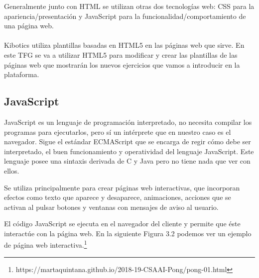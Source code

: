 Generalmente junto con HTML se utilizan otras dos tecnologías web: CSS para la apariencia/presentación y JavaScript para la funcionalidad/comportamiento de una página web.
\\
\\
Kibotics utiliza plantillas basadas en HTML5 en las páginas web que sirve. En este TFG se va a utilizar HTML5 para modificar y crear las plantillas de las páginas web que mostrarán los nuevos ejercicios que vamos a introducir en la plataforma.

\subsection{JavaScript}
JavaScript es un lenguaje de programación interpretado, no necesita compilar los programas para ejecutarlos, pero sí un intérprete que en nuestro caso es el navegador. Sigue el estándar ECMAScript que se encarga de regir cómo debe ser interpretado, el buen funcionamiento y operatividad del lenguaje JavaScript. Este lenguaje posee una sintaxis derivada de C y Java pero no tiene nada que ver con ellos.

Se utiliza principalmente para crear páginas web interactivas, que incorporan efectos como texto que aparece y
desaparece, animaciones, acciones que se activan al pulsar botones y ventanas con
mensajes de aviso al usuario\cite{javascript}.

El código JavaScript se ejecuta en el navegador del cliente y permite que éste interactúe con la página web. En la siguiente Figura 3.2 podemos ver un ejemplo de página web interactiva.\footnote{https://martaquintana.github.io/2018-19-CSAAI-Pong/pong-01.html}

